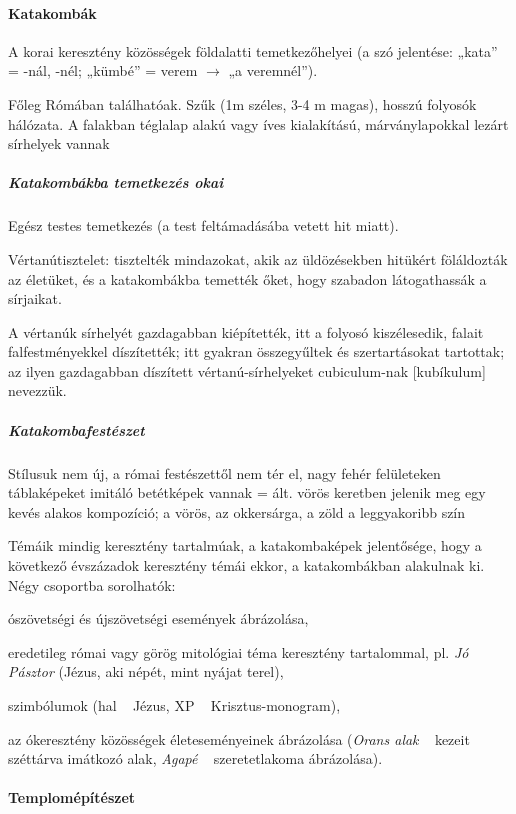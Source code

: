 	\paragraph{Katakombák}
	A korai keresztény közösségek földalatti temetkezőhelyei (a szó jelentése: „kata” = -nál, -nél; „kümbé” = verem $\rightarrow$ „a veremnél”).
	
	Főleg Rómában találhatóak. Szűk (1m széles, 3-4 m magas), hosszú folyosók hálózata. A falakban téglalap alakú vagy íves kialakítású, márványlapokkal lezárt sírhelyek vannak
	
		\subparagraph{Katakombákba temetkezés okai}
		Egész testes temetkezés (a test feltámadásába vetett hit miatt).
		
		Vértanútisztelet: tisztelték mindazokat, akik az üldözésekben hitükért föláldozták az életüket, és a katakombákba temették őket, hogy szabadon látogathassák a sírjaikat.
		
		A vértanúk sírhelyét gazdagabban kiépítették, itt a folyosó kiszélesedik, falait falfestményekkel díszítették; itt gyakran összegyűltek és szertartásokat tartottak; az ilyen gazdagabban díszített vértanú-sírhelyeket cubiculum-nak [kubíkulum] nevezzük.
	
		\subparagraph{Katakombafestészet}
		
		Stílusuk nem új, a római festészettől nem tér el, nagy fehér felületeken táblaképeket imitáló betétképek vannak = ált. vörös keretben jelenik meg egy kevés alakos kompozíció; a vörös, az okkersárga, a zöld a leggyakoribb szín
		
		Témáik mindig keresztény tartalmúak, a katakombaképek jelentősége, hogy a következő évszázadok keresztény témái ekkor, a katakombákban alakulnak ki. Négy csoportba sorolhatók:
		\begin{compactitem}
			\item  ószövetségi és újszövetségi események ábrázolása,
			\item eredetileg római vagy görög mitológiai téma keresztény tartalommal, pl. \textit{Jó Pásztor} (Jézus, aki népét, mint nyájat terel), 
			\item szimbólumok (hal ~ Jézus, XP ~ Krisztus-monogram),
			\item az ókeresztény közösségek életeseményeinek ábrázolása (\textit{Orans alak} ~ kezeit széttárva imátkozó alak, \textit{Agapé} ~ szeretetlakoma ábrázolása).
		\end{compactitem}
	
	\paragraph{Templomépítészet}
	
